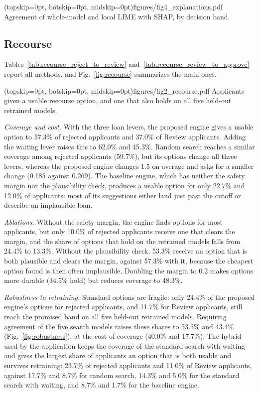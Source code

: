 

\Figure[t!](topskip=0pt, botskip=0pt, midskip=0pt){figures/fig4_explanations.pdf}
{Agreement of whole-model and local LIME with SHAP, by decision band.\label{fig:explanations}}

\subsection{Recourse}
Tables~\ref{tab:recourse_reject_to_review} and~\ref{tab:recourse_review_to_approve} report all methods, and
Fig.~\ref{fig:recourse} summarizes the main ones.




\Figure[t!](topskip=0pt, botskip=0pt, midskip=0pt){figures/fig2_recourse.pdf}
{Applicants given a usable recourse option, and one that also holds on all five held-out retrained models.\label{fig:recourse}}

\emph{Coverage and cost.} With the three loan levers, the proposed engine gives a usable option to 57.3\% of
rejected applicants and 37.0\% of Review applicants. Adding the waiting lever raises this to 62.0\% and 45.3\%. Random
search reaches a similar coverage among rejected applicants (59.7\%), but its options change all three levers, whereas
the proposed engine changes 1.5 on average and asks for a smaller change (0.185 against 0.269). The baseline engine,
which has neither the safety margin nor the plausibility check, produces a usable option for only 22.7\% and 12.0\% of
applicants: most of its suggestions either land just past the cutoff or describe an implausible loan.

\emph{Ablations.} Without the safety margin, the engine finds options for most applicants, but only 10.0\% of
rejected applicants receive one that clears the margin, and the share of options that hold on the retrained models
falls from 24.4\% to 13.3\%. Without the plausibility check, 53.3\% receive an option that is both plausible and clears
the margin, against 57.3\% with it, because the cheapest option found is then often implausible. Doubling the margin to
0.2 makes options more durable (34.5\% hold) but reduces coverage to 48.3\%.

\emph{Robustness to retraining.} Standard options are fragile: only 24.4\% of the proposed engine's options for
rejected applicants, and 11.7\% for Review applicants, still reach the promised band on all five held-out retrained
models. Requiring agreement of the five search models raises these shares to 53.3\% and 43.4\%
(Fig.~\ref{fig:robustness}), at the cost of coverage (40.0\% and 17.7\%). The hybrid used by the application keeps the
coverage of the standard search with waiting and gives the largest share of applicants an option that is both usable
and survives retraining: 23.7\% of rejected applicants and 11.0\% of Review applicants, against 17.7\% and 8.7\% for
random search, 14.3\% and 5.0\% for the standard search with waiting, and 8.7\% and 1.7\% for the baseline engine.

